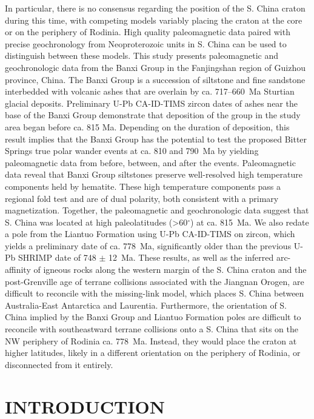 \documentclass[11pt,letterpaper]{article}
\newcommand{\degrees}{$^{\circ}$\xspace}
\begin{document}
In particular, there is no consensus regarding the position of the S. China craton during this time, with competing models variably placing the craton at the core or on the periphery of Rodinia. High quality paleomagnetic data paired with precise geochronology from Neoproterozoic units in S. China can be used to distinguish between these models. This study presents paleomagnetic and geochronologic data from the Banxi Group in the Fanjingshan region of Guizhou province, China. The Banxi Group is a succession of siltstone and fine sandstone interbedded with volcanic ashes that are overlain by ca. 717--660~Ma Sturtian glacial deposits. Preliminary U-Pb CA-ID-TIMS zircon dates of ashes near the base of the Banxi Group demonstrate that deposition of the group in the study area began before ca. 815 Ma. Depending on the duration of deposition, this result implies that the Banxi Group has the potential to test the proposed Bitter Springs true polar wander events at ca. 810 and 790~Ma by yielding paleomagnetic data from before, between, and after the events. Paleomagnetic data reveal that Banxi Group siltstones preserve well-resolved high temperature components held by hematite. These high temperature components pass a regional fold test and are of dual polarity, both consistent with a primary magnetization. Together, the paleomagnetic and geochronologic data suggest that S. China was located at high paleolatitudes (\textgreater60\degrees) at ca. 815~Ma. We also redate a pole from the Liantuo Formation using U-Pb CA-ID-TIMS on zircon, which yields a preliminary date of ca. 778~Ma, significantly older than the previous U-Pb SHRIMP date of 748 $\pm$ 12~Ma. These results, as well as the inferred arc-affinity of igneous rocks along the western margin of the S. China craton and the post-Grenville age of terrane collisions associated with the Jiangnan Orogen, are difficult to reconcile with the missing-link model, which places S. China between Australia-East Antarctica and Laurentia. Furthermore, the orientation of S. China implied by the Banxi Group and Liantuo Formation poles are difficult to reconcile with southeastward terrane collisions onto a S. China that sits on the NW periphery of Rodinia ca. 778~Ma. Instead, they would place the craton at higher latitudes, likely in a different orientation on the periphery of Rodinia, or disconnected from it entirely.

\section*{INTRODUCTION \label{sec:INTRODUCTION}}
\end{document}
